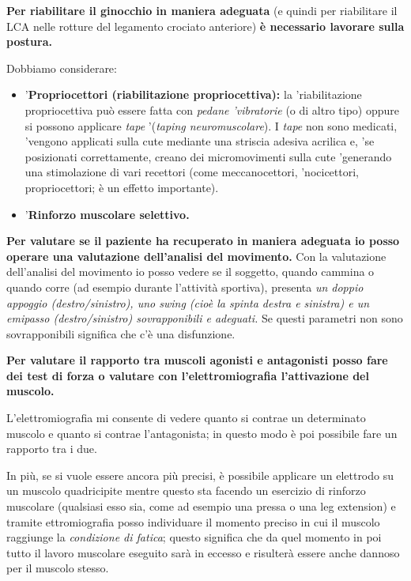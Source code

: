 \textbf{Per riabilitare il ginocchio in maniera adeguata} (e quindi per
riabilitare il LCA nelle rotture del legamento crociato anteriore)
\textbf{è necessario lavorare sulla postura.}

Dobbiamo considerare:

\begin{itemize}
\item
 '\textbf{Propriocettori (riabilitazione propriocettiva):} la
 'riabilitazione propriocettiva può essere fatta con \emph{pedane
 'vibratorie} (o di altro tipo) oppure si possono applicare \emph{tape}
 '(\emph{taping neuromuscolare}). I \emph{tape} non sono medicati,
 'vengono applicati sulla cute mediante una striscia adesiva acrilica e,
 'se posizionati correttamente, creano dei micromovimenti sulla cute
 'generando una stimolazione di vari recettori (come meccanocettori,
 'nocicettori, propriocettori; è un effetto importante).
\item
 '\textbf{Rinforzo muscolare selettivo.}
\end{itemize}

\textbf{Per valutare se il paziente ha recuperato in maniera adeguata io
posso operare una valutazione dell'analisi del movimento.} Con la
valutazione dell'analisi del movimento io posso vedere se il soggetto,
quando cammina o quando corre (ad esempio durante l'attività sportiva),
presenta \emph{un doppio appoggio (destro/sinistro), uno swing (cioè la
spinta destra e sinistra) e un emipasso (destro/sinistro) sovrapponibili
e adeguati.} Se questi parametri non sono sovrapponibili significa che
c'è una disfunzione.

\textbf{Per valutare il rapporto tra muscoli agonisti e antagonisti
posso fare dei test di forza o valutare con l'elettromiografia
l'attivazione del muscolo. }

L'elettromiografia mi consente di vedere quanto si contrae un
determinato muscolo e quanto si contrae l'antagonista; in questo modo è
poi possibile fare un rapporto tra i due.

In più, se si vuole essere ancora più precisi, è possibile applicare un
elettrodo su un muscolo quadricipite mentre questo sta facendo un
esercizio di rinforzo muscolare (qualsiasi esso sia, come ad esempio una
pressa o una leg extension) e tramite ettromiografia posso individuare
il momento preciso in cui il muscolo raggiunge la \emph{condizione di
fatica}; questo significa che da quel momento in poi tutto il lavoro
muscolare eseguito sarà in eccesso e risulterà essere anche dannoso per
il muscolo stesso.

